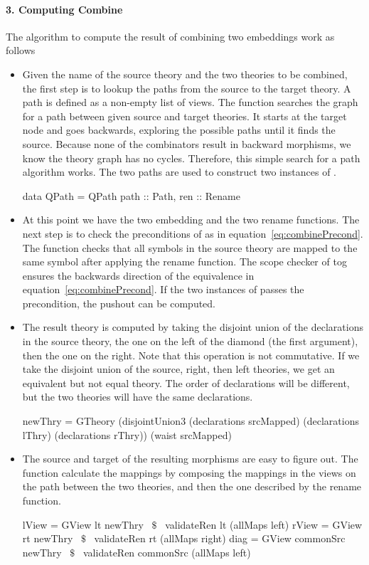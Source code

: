 \paragraph{3. Computing Combine}
The algorithm to compute the result of combining two embeddings work as follows 
\begin{itemize}
    \item Given the name of the source theory and the two theories to be combined, the first step is to lookup the paths from the source to the target theory. A path is defined as a non-empty list of views. The function  searches the graph for a path between given source and target theories. It starts at the target node and goes backwards, exploring the possible paths until it finds the source. Because none of the combinators result in backward morphisms, we know the theory graph has no cycles. Therefore, this simple search for a path algorithm works. The two paths are used to construct two instances of . 
\begin{hscode}
data QPath = QPath { 
  path :: Path,
  ren  :: Rename }
\end{hscode}

    \item At this point we have the two embedding and the two rename functions. The next step is to check the preconditions of  as in equation~\ref{eq:combinePrecond}. The function  checks that all symbols in the source theory are mapped to the same symbol after applying the rename function. The scope checker of tog ensures the backwards direction of the equivalence in equation~\ref{eq:combinePrecond}. If the two instances of  passes the precondition, the pushout can be computed.
    
    \item The result theory is computed by taking the disjoint union of the declarations in the source theory, the one on the left of the diamond (the first argument), then the one on the right. Note that this operation is not commutative. If we take the disjoint union of the source, right, then left theories, we get an equivalent but not equal theory. The order of declarations will be different, but the two theories will have the same declarations. 
\begin{hscode}
 newThry = 
   GTheory (disjointUnion3 (declarations srcMapped)
                           (declarations lThry) 
                           (declarations rThry)) 
           (waist srcMapped)
\end{hscode}    
    \item The source and target of the resulting morphisms are easy to figure out. The function  calculate the mappings by composing the mappings in the views on the path between the two theories, and then the one described by the rename function. 
\begin{hscode}
lView = GView lt newThry ~$\$$~ validateRen lt (allMaps left)
rView = GView rt newThry ~$\$$~ validateRen rt (allMaps right)
diag  = 
  GView commonSrc newThry ~$\$$~ validateRen commonSrc (allMaps left)
\end{hscode}
\end{itemize}

